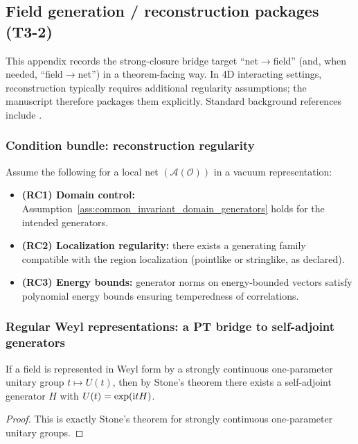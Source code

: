 \subsection{Field generation / reconstruction packages (T3-2)}
\label{app:field_reconstruction_theorems}

\AuditTag This appendix records the strong-closure bridge target ``net$\to$field'' (and, when needed, ``field$\to$net'') in a theorem-facing way.
In 4D interacting settings, reconstruction typically requires additional regularity assumptions; the manuscript therefore packages them explicitly.
Standard background references include \cite{StreaterWightman1989,Haag1996LocalQuantumPhysics}.

\subsubsection{Condition bundle: reconstruction regularity}
\begin{assumption}
\label{ass:reconstruction_bundle_template}
Assume the following for a local net $(\mathcal{A}(\mathcal{O}))$ in a vacuum representation:
\begin{itemize}
\item \textbf{(RC1) Domain control:} Assumption~\ref{ass:common_invariant_domain_generators} holds for the intended generators.
\item \textbf{(RC2) Localization regularity:} there exists a generating family compatible with the region localization (pointlike or stringlike, as declared).
\item \textbf{(RC3) Energy bounds:} generator norms on energy-bounded vectors satisfy polynomial energy bounds ensuring temperedness of correlations.
\end{itemize}
\end{assumption}

\subsubsection{Regular Weyl representations: a PT bridge to self-adjoint generators}
\begin{proposition}
\label{prop:stone_bridge_weyl}
\MathTag If a field is represented in Weyl form by a strongly continuous one-parameter unitary group $t\mapsto U(t)$, then by Stone's theorem \cite{Stone1932} there exists a self-adjoint generator $H$ with $U(t)=\exp(\mathrm{i} tH)$.
\end{proposition}
\begin{proof}
This is exactly Stone's theorem for strongly continuous one-parameter unitary groups.
\end{proof}

